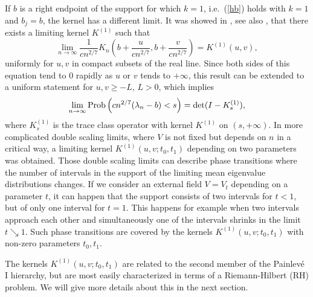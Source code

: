 \documentclass[11pt,fleqn]{article}
\numberwithin{equation}{section}
\begin{document}
If $b$ is a right endpoint of the support for which $k=1$, i.e.\ (\ref{hb}) holds with $k=1$ and $b_j=b$, the
 kernel has a different limit. It was showed in
\cite{CV2}, see also \cite{BB, BMP}, that there exists a limiting kernel $K^{(1)}$ such that
\begin{equation}
\lim_{n\to\infty}\frac{1}{cn^{2/7}}K_n\left(b+\frac{u}{cn^{2/7}},
b+\frac{v}{cn^{2/7}}\right)=K^{(1)}(u,v),
\end{equation}
uniformly for $u,v$ in compact subsets of the real line. Since both sides of this equation tend to $0$ rapidly as $u$ or $v$
tends to $+\infty$, this result can be extended to a uniform statement for
$u,v\geq -L$, $L>0$, which implies
\begin{equation}\label{TW1}
\lim_{n\to\infty}{\rm
Prob}\left(cn^{2/7}(\lambda_n-b)<s\right)=\det(I-K_s^{(1)}),
\end{equation}
where $K_s^{(1)}$ is the trace class operator with kernel $K^{(1)}$
on $(s,+\infty)$. In more complicated double scaling limits, where
$V$ is not fixed but depends on $n$ in a critical way, a limiting
kernel $K^{(1)}(u,v;t_0,t_1)$ depending on two parameters was
obtained. Those double scaling limits can describe phase transitions
where the number of intervals in the support of the limiting mean
eigenvalue distributions changes. If we consider an external field
$V=V_t$ depending on a parameter $t$, it can happen that the support
consists of two intervals for $t<1$, but of only one interval for
$t=1$. This happens for example when two intervals approach each
other and simultaneously one of the intervals shrinks in the limit
$t\searrow 1$. Such phase transitions are covered by the kernels
$K^{(1)}(u,v;t_0,t_1)$ with non-zero parameters $t_0, t_1$.


The kernels $K^{(1)}(u,v;t_0,t_1)$ are related to the
second member of the Painlev\'e I hierarchy, but are most easily
characterized in terms of a Riemann-Hilbert (RH) problem. We will
give more details about this in the next section.
\end{document}
